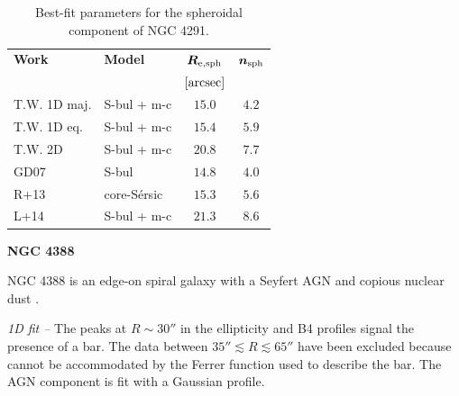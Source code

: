 \documentclass[preprint2]{emulateapj}
\begin{document}
  \begin{table}[h]
  \small
  \caption{Best-fit parameters for the spheroidal component of NGC 4291.}
  \begin{center}
  \begin{tabular}{llcc}
  \hline
  {\bf Work} & {\bf Model}   & $\bm R_{\rm e,sph}$    & $\bm n_{\rm sph}$ \\
    &  &  $[\rm arcsec]$ & \\
  \hline
  T.W. 1D maj. & S-bul + m-c & $15.0$  &  $4.2$ \\
  T.W. 1D eq.  & S-bul + m-c & $15.4$  &  $5.9$ \\
  T.W. 2D      & S-bul + m-c & $20.8$  &  $7.7$ \\
  \hline
  GD07         & S-bul         & $14.8$  &  $4.0$ \\
  R+13         & core-S\'ersic & $15.3$  &  $5.6$ \\
  L+14         & S-bul + m-c   & $21.3$  &  $8.6$ \\
  \hline
  \end{tabular}
  \end{center}
  \label{tab:n4291}
  \end{table}

  \clearpage\newpage\noindent
  {\bf NGC 4388 \\}

  NGC 4388 is an edge-on spiral galaxy with a Seyfert AGN \citep{veroncettyveron2006} 
  and copious nuclear dust \citep{martini2003}.

  \emph{1D fit -- }
  The peaks at $R \sim 30''$ in the ellipticity and B4 profiles signal the presence of a bar.
  The data between $35'' \lesssim R \lesssim 65''$ have been excluded because cannot be accommodated by the Ferrer function 
  used to describe the bar. 
  The AGN component is fit with a Gaussian profile.
\end{document}
